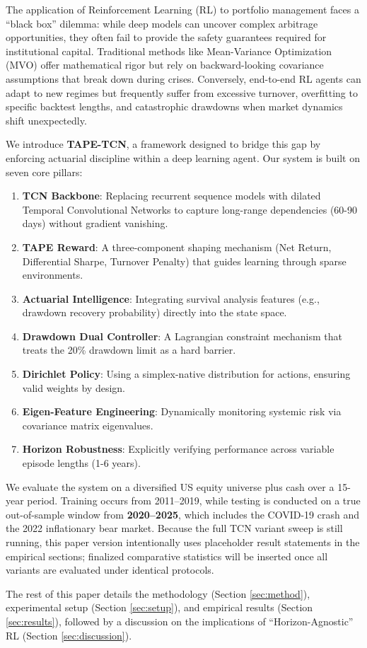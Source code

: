 The application of Reinforcement Learning (RL) to portfolio management faces a ``black box'' dilemma: while deep models can uncover complex arbitrage opportunities, they often fail to provide the safety guarantees required for institutional capital. 
Traditional methods like Mean-Variance Optimization (MVO) \citep{markowitz1952portfolio} offer mathematical rigor but rely on backward-looking covariance assumptions that break down during crises. 
Conversely, end-to-end RL agents can adapt to new regimes but frequently suffer from excessive turnover, overfitting to specific backtest lengths, and catastrophic drawdowns when market dynamics shift unexpectedly.

We introduce \textbf{TAPE-TCN}, a framework designed to bridge this gap by enforcing actuarial discipline within a deep learning agent. Our system is built on seven core pillars:

\begin{enumerate}
    \item \textbf{TCN Backbone}: Replacing recurrent sequence models with dilated Temporal Convolutional Networks \citep{bai2018tcn} to capture long-range dependencies (60-90 days) without gradient vanishing.
    \item \textbf{TAPE Reward}: A three-component shaping mechanism (Net Return, Differential Sharpe, Turnover Penalty) that guides learning through sparse environments.
    \item \textbf{Actuarial Intelligence}: Integrating survival analysis features (e.g., drawdown recovery probability) directly into the state space.
    \item \textbf{Drawdown Dual Controller}: A Lagrangian constraint mechanism that treats the 20\% drawdown limit as a hard barrier.
    \item \textbf{Dirichlet Policy}: Using a simplex-native distribution for actions, ensuring valid weights by design.
    \item \textbf{Eigen-Feature Engineering}: Dynamically monitoring systemic risk via covariance matrix eigenvalues.
    \item \textbf{Horizon Robustness}: Explicitly verifying performance across variable episode lengths (1-6 years).
\end{enumerate}

We evaluate the system on a diversified US equity universe plus cash over a 15-year period.
Training occurs from 2011--2019, while testing is conducted on a true out-of-sample window from \textbf{2020--2025}, which includes the COVID-19 crash and the 2022 inflationary bear market.
Because the full TCN variant sweep is still running, this paper version intentionally uses placeholder result statements in the empirical sections; finalized comparative statistics will be inserted once all variants are evaluated under identical protocols.

The rest of this paper details the methodology (Section \ref{sec:method}), experimental setup (Section \ref{sec:setup}), and empirical results (Section \ref{sec:results}), followed by a discussion on the implications of ``Horizon-Agnostic'' RL (Section \ref{sec:discussion}).
